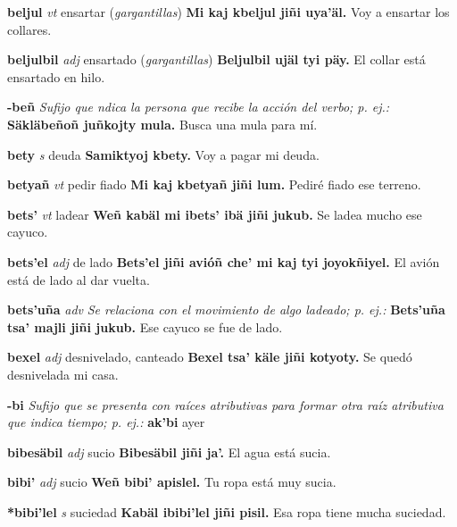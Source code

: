 \documentclass[10pt]{scrbook}
\newcommand{\entry}[1]{\textbf{#1}}
\newcommand{\nontranslationdef}[1]{\textit{#1}}
\newcommand{\partofspeech}[1]{\textit{#1}}
\newcommand{\spanishtranslation}[1]{#1}
\newcommand{\clarification}[1]{(\textit{#1})}
\newcommand{\cholexample}[1]{\textbf{#1}}
\newcommand{\exampletranslation}[1]{#1}
\begin{document}
\begin{multicols}{2}
\entry{beljul}
\partofspeech{vt}
\spanishtranslation{ensartar}
\clarification{gargantillas}
\cholexample{Mi kaj kbeljul jiñi uya'äl.}
\exampletranslation{Voy a ensartar los collares.}

\entry{beljulbil}
\partofspeech{adj}
\spanishtranslation{ensartado}
\clarification{gargantillas}
\cholexample{Beljulbil ujäl tyi päy.}
\exampletranslation{El collar está ensartado en hilo.}

\entry{-beñ}
\nontranslationdef{Sufijo que ndica la persona que recibe la acción del verbo; p. ej.:}
\cholexample{Säkläbeñoñ juñkojty mula.}
\exampletranslation{Busca una mula para mí.}

\entry{bety}
\partofspeech{s}
\spanishtranslation{deuda}
\cholexample{Samiktyoj kbety.}
\exampletranslation{Voy a pagar mi deuda.}

\entry{betyañ}
\partofspeech{vt}
\spanishtranslation{pedir fiado}
\cholexample{Mi kaj kbetyañ jiñi lum.}
\exampletranslation{Pediré fiado ese terreno.}

\entry{bets'}
\partofspeech{vt}
\spanishtranslation{ladear}
\cholexample{Weñ kabäl mi ibets' ibä jiñi jukub.}
\exampletranslation{Se ladea mucho ese cayuco.}

\entry{bets'el}
\partofspeech{adj}
\spanishtranslation{de lado}
\cholexample{Bets'el jiñi avióñ che' mi kaj tyi joyokñiyel.}
\exampletranslation{El avión está de lado al dar vuelta.}

\entry{bets'uña}
\partofspeech{adv}
\nontranslationdef{Se relaciona con el movimiento de algo ladeado; p. ej.:}
\cholexample{Bets'uña tsa' majli jiñi jukub.}
\exampletranslation{Ese cayuco se fue de lado.}

\entry{bexel}
\partofspeech{adj}
\spanishtranslation{desnivelado, canteado}
\cholexample{Bexel tsa' käle jiñi kotyoty.}
\exampletranslation{Se quedó desnivelada mi casa.}

\entry{-bi}
\nontranslationdef{Sufijo que se presenta con raíces atributivas para formar otra raíz atributiva que indica tiempo; p. ej.:}
\cholexample{ak'bi}
\exampletranslation{ayer}

\entry{bibesäbil}
\partofspeech{adj}
\spanishtranslation{sucio}
\cholexample{Bibesäbil jiñi ja'.}
\exampletranslation{El agua está sucia.}

\entry{bibi'}
\partofspeech{adj}
\spanishtranslation{sucio}
\cholexample{Weñ bibi' apislel.}
\exampletranslation{Tu ropa está muy sucia.}

\entry{*bibi'lel}
\partofspeech{s}
\spanishtranslation{suciedad}
\cholexample{Kabäl ibibi'lel jiñi pisil.}
\exampletranslation{Esa ropa tiene mucha suciedad.}


\end{multicols}
\end{document}
